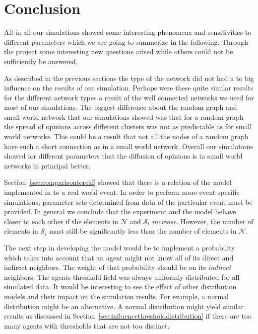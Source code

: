 
\section{Conclusion}
\label{sec:conclusion}

All in all our simulations showed some interesting phenomena and sensitivities
to different parameters which we are going to summerize in the
following. Through the project some interesting new questions arised while
others could not be sufficiently be answered.

As described in the previous sections the type of the network did not had a to
big influence on the results of our simulation. Perhaps were these quite
similar results for the different network types a result of the well connected
networks we used for most of our simulations. The biggest difference about the
random graph and small world network that our simulations showed was that for a
random graph the spread of opinions across different clusters was not as
predictable as for small world networks. This could be a result that not all
the nodes of a random graph have such a short connection as in a small world
network. Overall our simulations showed for different parameters that the
diffusion of opinions is in small world networks in principal better.

Section~\ref{sec:comparisontoreal} showed that there is a relation of the model
implemented in \matlab to a real world event.  In order to perform more event
specific simulations, parameter sets determined from data of the particular
event must be provided.  In general we conclude that the experiment and the
model behave closer to each other if the elements in $\mathcal{N}$ and
$\mathcal{S}_i$ \emph{increase}.  However, the number of elements in
$\mathcal{S}_i$ must still be significantly less than the number of elements in
$\mathcal{N}$.

The next step in developing the model would be to implement a probability which
takes into account that an agent might not know all of its direct and indirect
neighbors.  The weight of that probability should be on its \emph{indirect}
neighbors.  The agents threshold field was always uniformly distributed for all
simulated data.  It would be interesting to see the effect of other
distribution models and their impact on the simulation results.  For example, a
normal distribution might be an alternative.  A normal distribution might yield
similar results as discussed in
Section~\ref{sec:influencethresholddistribution} if there are too many agents
with thresholds that are not too distinct. 



